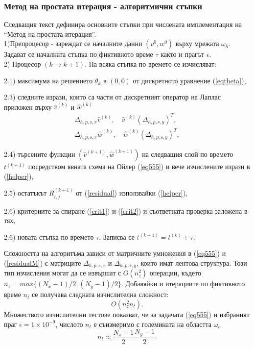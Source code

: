 \documentclass{article}
\newcommand{\be}{\begin{equation}}
\newcommand{\ee}{\end{equation}}
\newcommand{\rf}[1]{(\ref{#1})}
\theoremstyle{remark}
\begin{document}
\subsubsection{Метод на простата итерация - алгоритмични стъпки}
Следващия текст дефинира основните стъпки при числената имплементация на ``Метод на простата итерация''.
\\
1)Препроцесор - зареждат се началните данни $(v^0, w^0)$ върху мрежата $\omega_h$.  Задават се началната стъпка по фиктивното време $\tau$ както и прагът $\epsilon$.
\\
2) Процесор $(k \rightarrow k+1)$. На всяка стъпка по времето се изчисляват: 
\par
2.1) максимума на решението $\theta_k$ в $(0,0)$  от дискретното уравнение \rf{eqtheta},
\par
2.3) следните изрази, които са части от дискретният оператор на Лаплас приложен върху $\widehat{v}^{(k)}$ и $\widehat{w}^{(k)}$
\begin{align}\label{helper}
\Delta_{h,p,s,x}  \widehat{v}^{(k)}, \quad \widehat{v}^{(k)}  (\Delta_{h,p,s,y})^T, \nonumber\\
\Delta_{h,p,s,x}  \widehat{w}^{(k)},\quad  \widehat{w}^{(k)}  (\Delta_{h,p,s,y})^T,
\end{align}
\par
2.4) търсените функции $(\widehat{v}^{(k+1)}, \widehat{w}^{(k+1)})$  на следващия слой по времето $t^{(k+1)}$ посредством явната схема на Ойлер \rf{eq555} и вече изчислените изрази в \rf{helper},
\par
2.5) остатъкът $R^{(k+1)}_{i,j}$ от \rf{residual} използвайки \rf{helper},
\par
2.6) критериите за спиране  \rf{crit1} и \rf{crit2} и съответната проверка заложена в тях,
\par
2.6) новата стъпка по времето $\tau$. Записва се $t^{(k+1)}=t^{(k)}+\tau$.

Сложността на алгоритъма зависи от матричните умножения в \rf{eq555} и \rf{residualM} с матриците $\Delta_{h,p,s,x}$ и $\Delta_{h,p,s,y}$, които имат лентова структура. Този тип изчисления могат да се извършат с $O(n_z^2)$ операции, където $n_z = max\{(N_x-1)/2, (N_y-1)/2\}$.  Добавяйки и итерациите по фиктивното време $n_t$ се получава следната изчислителна сложност:
\be\label{complexElpt}
O(n_z^2 n_t).
\ee
Множеството изчислителни тестове показват, че за задачата \rf{eq555} и избраният праг $\epsilon = 1 \times 10^{-9}$, числото $n_t$ е съизмеримо с големината на областта $\omega_h$
\be
n_t \approx \frac{N_x-1}{2} \frac{N_y-1}{2}.
\ee
\end{document}
